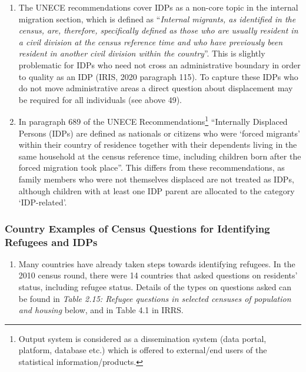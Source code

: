 \documentclass[
]{article}
\providecommand{\tightlist}{%
  \setlength{\itemsep}{0pt}\setlength{\parskip}{0pt}}
\begin{document}
\begin{enumerate}
\def\labelenumi{\arabic{enumi}.}
\setcounter{enumi}{97}
\item
  The UNECE recommendations cover IDPs as a non-core topic in the
  internal migration section, which is defined as ``\emph{Internal migrants,
  as identified in the census, are, therefore, specifically defined as
  those who are usually resident in a civil division at the} \emph{census
  reference time and who have previously been resident in another
  civil division within the country}''. This is slightly problematic
  for IDPs who need not cross an administrative boundary in order to
  quality as an IDP (IRIS, 2020 paragraph 115). To capture these IDPs
  who do not move administrative areas a direct question about
  displacement may be required for all individuals (see above 49).
\item
  In paragraph 689 of the UNECE Recommendations\footnote{Output system is considered as a dissemination system (data
    portal, platform, database etc.) which is offered to external/end
    users of the statistical information/products.} ``Internally
  Displaced Persons (IDPs) are defined as nationals or citizens who
  were `forced migrants' within their country of residence together
  with their dependents living in the same household at the census
  reference time, including children born after the forced migration
  took place''. This differs from these recommendations, as family
  members who were not themselves displaced are not treated as IDPs,
  although children with at least one IDP parent are allocated to the
  category `IDP-related'.
\end{enumerate}

\hypertarget{a.3.-country-examples-of-census-questions-for-identifying-refugees-and-idps}{%
\subsubsection{Country Examples of Census Questions for Identifying Refugees and IDPs}\label{a.3.-country-examples-of-census-questions-for-identifying-refugees-and-idps}}

\begin{enumerate}
\def\labelenumi{\arabic{enumi}.}
\setcounter{enumi}{99}
\tightlist
\item
  Many countries have already taken steps towards identifying
  refugees. In the 2010 census round, there were 14 countries that
  asked questions on residents' status, including refugee status.
  Details of the types on questions asked can be found in \emph{Table 2.15:
  Refugee questions in selected censuses of population and housing}
  below, and in Table 4.1 in IRRS.
\end{enumerate}
\end{document}
